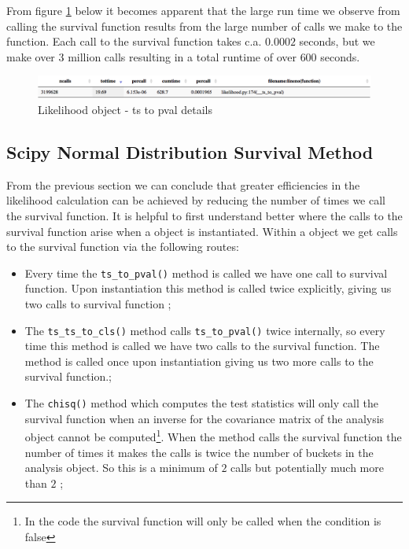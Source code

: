 From figure \ref{fig:ts_to_pval} below it becomes apparent that the large run time we observe from calling the survival function results from the large number of calls we make to the function. Each call to the survival function takes c.a. $0.0002$ seconds, but we make over $3$ million calls resulting in a total runtime of over $600$ seconds. 

\begin{figure}[H]
\centering
\includegraphics[scale=0.3]{plots/likelihood_count.png}
\caption{Likelihood object - ts to pval details}
\label{fig:ts_to_pval}
\end{figure}

\subsection{Scipy Normal Distribution Survival Method}
From the previous section we can conclude that greater efficiencies in the likelihood calculation can be achieved by reducing the number of times we call the survival function. It is helpful to first understand better where the calls to the survival function arise when a  object is instantiated. Within a  object we get calls to the survival function via the following routes:

\begin{itemize}
\item[1.] Every time the \texttt{ts\_to\_pval()} method is called we have one call to survival function. Upon instantiation this method is called twice explicitly, giving us two calls to survival function ;
\item[2.]The \texttt{ts\_ts\_to\_cls()} method calls \texttt{ts\_to\_pval()} twice internally, so every time this method is called we have two calls to the survival function. The method is called once upon instantiation giving us two more calls to the survival function.;
\item[3.] The \texttt{chisq()} method which computes the test statistics will only call the survival function when an inverse for the covariance matrix of the analysis object cannot be computed\footnote{In the code the survival function will only be called when the condition  is false}. When the method calls the survival function the number of times it makes the calls is twice the number of buckets in the analysis object. So this is a minimum of $2$ calls but potentially much more than $2$ ;
\end{itemize}


